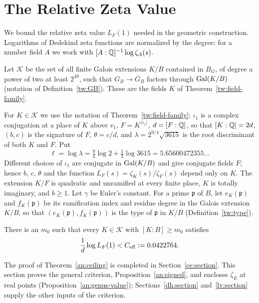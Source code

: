 \section{The Relative Zeta Value}\label{an:section}

We bound the relative zeta value $L_F(1)$ needed in the geometric
construction. Logarithms of Dedekind zeta functions are normalized by the
degree: for a number field $A$ we work with $[A:\mathbb Q]^{-1}\log\zeta_A(s)$.

\begin{definition}\label{an:family}
Let $\mathcal K$ be the set of all finite Galois extensions $K/B$ contained
in $B_G$, of degree a power of two at least $2^{49}$, such that
$G_B\to\overline G_B$ factors through $\operatorname{Gal}(K/B)$ (notation of
Definition~\ref{tw:GB}). These are the fields $K$ of
Theorem~\ref{tw:field-family}.
\end{definition}

For $K\in\mathcal K$ we use the notation of
Theorem~\ref{tw:field-family}: $\iota_1$ is a complex conjugation at a place of $K$ above
$v_1$, $F=K^{\langle\iota_1\rangle}$, $d=[F:\mathbb Q]$, so that $[K:\mathbb Q]=2d$, $(b,c)$
is the signature of $F$, $\theta=c/d$, and $\lambda=2^{9/4}\sqrt{3615}$ is the
root discriminant of both $K$ and $F$. Put
\[
 \ell=\log\lambda=\tfrac94\log2+\tfrac12\log3615=5.65600472355\ldots
\]
Different choices of $\iota_1$ are conjugate in $\operatorname{Gal}(K/B)$ and give
conjugate fields $F$; hence $b$, $c$, $\theta$ and the function
$L_F(s)=\zeta_K(s)/\zeta_F(s)$ depend only on $K$. The extension $K/F$ is
quadratic and unramified at every finite place, $K$ is totally imaginary,
and $b\ge1$. Let $\gamma$ be Euler's constant. For a
prime $\mathfrak p$ of $B$, let $e_K(\mathfrak p)$ and $f_K(\mathfrak p)$ be
its ramification index and residue degree in the Galois extension $K/B$, so
that $(e_K(\mathfrak p),f_K(\mathfrak p))$ is the type of $\mathfrak p$ in
$K/B$ (Definition~\ref{tw:type}).


\begin{theorem}\label{an:ceiling}
There is an $m_0$ such that every $K\in\mathcal K$ with $[K:B]\ge m_0$
satisfies
\[
 \frac1d\log L_F(1)<C_{\rm eff}:=0.0422764.
\]
\end{theorem}

The proof of Theorem~\ref{an:ceiling} is completed in
Section~\ref{ce:section}. This section proves the general criterion,
Proposition~\ref{an:signed}, and encloses $\zeta_E$ at real points
(Proposition~\ref{an:genus-value}); Sections~\ref{dh:section}
and~\ref{lv:section} supply the other inputs of the criterion.

